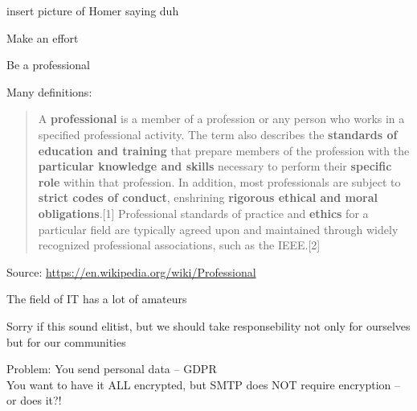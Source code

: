 \documentclass[Screen16to9,17pt]{foils}
\begin{document}


insert picture of Homer saying duh

\begin{quote}

\end{quote}

\begin{list2}
\item Make an effort
\item Be a professional
\end{list2}

Many definitions:
\begin{quote}
A {\bf professional} is a member of a profession or any person who works in a specified professional activity. The term also describes the {\bf standards of education and training} that prepare members of the profession with the {\bf particular knowledge and skills} necessary to perform their {\bf specific role} within that profession. In addition, most professionals are subject to {\bf strict codes of conduct}, enshrining {\bf rigorous ethical and moral obligations}.[1] Professional standards of practice and {\bf ethics} for a particular field are typically agreed upon and maintained through widely recognized professional associations, such as the IEEE.[2]
\end{quote}
Source: \url{https://en.wikipedia.org/wiki/Professional}

\begin{list2}
\item The field of IT has a lot of amateurs
\item Sorry if this sound elitist, but we should take responsebility not only for ourselves but for our communities
\end{list2}


Problem: You send personal data -- GDPR\\
You want to have it ALL encrypted, but SMTP does NOT require encryption -- or does it?!

\vskip 1cm
\end{document}
